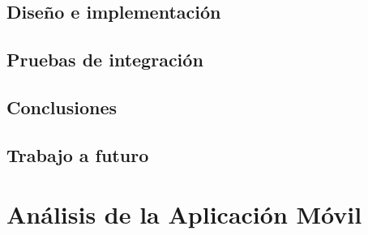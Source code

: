 \documentclass[12pt]{book}
\begin{document}


\chapter{Diseño e implementación}\label{chp:Implementacion}

\chapter{Pruebas de integración}

\chapter{Conclusiones}
\chapter{Trabajo a futuro}

\part{Análisis de la Aplicación Móvil}
\end{document}
